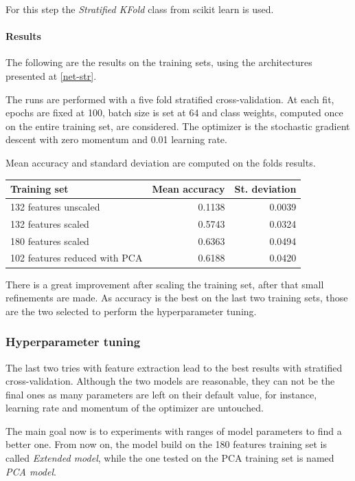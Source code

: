For this step the \emph{Stratified KFold} class from scikit learn is used.~\cite{cross-scikit}

\paragraph{Results}
The following are the results on the training sets, using the architectures 
presented at \vref{net-str}. 

The runs are performed with a five fold stratified cross-validation. 
At each fit, epochs are fixed at 100, 
batch size is set at 64 and class weights, computed once on 
the entire training set, are considered. 
The optimizer is the stochastic gradient descent with zero momentum and 
0.01 learning rate. 

Mean accuracy and standard deviation are computed on the 
folds results.
\begin{center}
    \begin{tabular}{ |l|r|r| } 
        \hline
        Training set & Mean accuracy & St. deviation \\
        \hline
        132 features unscaled &  0.1138 & 0.0039 \\
        132 features scaled &  0.5743 & 0.0324 \\
        180 features scaled &  0.6363 & 0.0494 \\
        102 features reduced with PCA &  0.6188 & 0.0420 \\
        \hline
    \end{tabular}
\end{center}

There is a great improvement after scaling the training set, after 
that small refinements are made.
As accuracy is the best on the last two training sets, those are the two selected to 
perform the hyperparameter tuning.

\subsubsection{Hyperparameter tuning}

The last two tries with feature extraction lead to the best results 
with stratified cross-validation. Although the two models are reasonable, 
they can not be the final ones as many parameters are left on their default value, 
for instance, learning rate and momentum of the optimizer are untouched. 

The main goal now is to experiments with ranges of model parameters 
to find a better one. From now on, the model build on the 180 features training set is 
called \emph{Extended model}, 
while the one tested on the PCA training set is named \emph{PCA model}.

